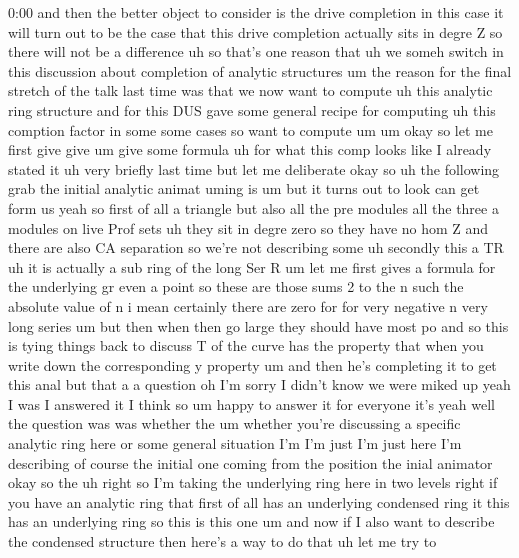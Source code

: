 \begin{unfinished}{0:00}
and  then  the  better  object  to  consider
is  the  drive  completion  in  this  case  it
will  turn  out  to  be  the  case  that  this
drive  completion  actually  sits  in  degre
Z  so  there  will  not  be  a
difference  uh  so  that's  one  reason  that
uh  we  someh  switch  in  this  discussion
about  completion  of  analytic  structures
um  the  reason  for  the  final  stretch  of
the  talk  last  time  was  that  we  now  want
to
compute  uh  this  analytic  ring  structure
and  for  this  DUS  gave  some  general
recipe  for  computing  uh  this  comption
factor  in  some  some  cases
so  want  to
compute
um
um
okay  so  let  me  first  give  give  um  give
some  formula  uh  for  what  this  comp  looks
like  I  already  stated  it
uh  very  briefly  last  time  but  let  me
deliberate  okay
so  uh  the
following
grab  the  initial  analytic
animat
uming  is
um  but  it  turns  out
to  look  can  get  form
us
yeah  so  first  of  all  a  triangle  but  also
all  the  pre
modules  all  the  three  a  modules  on  live
Prof  sets  uh  they  sit  in  degre  zero
so  they  have  no  hom
Z  and  there  are  also  CA
separation  so  we're  not  describing
some  uh  secondly  this  a  TR
uh  it  is  actually  a  sub  ring  of  the  long
Ser
R
um  let  me
first  gives  a  formula  for  the  underlying
gr  even  a  point  so  these  are  those
sums  2  to  the
n
such  the  absolute  value  of  n  i  mean
certainly  there  are  zero  for  for  very
negative
n  very  long  series  um  but  then  when  then
go  large  they  should  have  most
po
and  so  this  is  tying  things  back  to
discuss  T  of  the
curve  has  the  property  that  when  you
write  down  the  corresponding
y  property  um  and  then  he's  completing
it  to  get  this  anal  but  that
a  a
question  oh  I'm  sorry  I  didn't  know  we
were  miked  up  yeah  I  was  I  answered  it  I
think  so  um  happy  to  answer  it  for
everyone  it's  yeah  well  the  question  was
was  whether  the  um  whether  you're
discussing  a  specific  analytic  ring  here
or  some  general  situation  I'm  I'm  just
I'm  just  here  I'm  describing  of  course
the
initial  one  coming  from  the  position  the
inial
animator
okay  so  the  uh  right  so  I'm  taking  the
underlying  ring  here  in  two  levels  right
if  you  have  an  analytic  ring  that  first
of  all  has  an  underlying  condensed  ring
it  this  has  an  underlying  ring  so  this
is  this  one  um  and  now  if  I  also  want  to
describe  the  condensed  structure  then
here's  a  way  to  do  that  uh  let  me  try  to

\end{unfinished}
